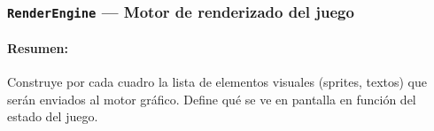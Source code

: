 \documentclass[11pt,a4paper]{article}
\begin{document}








\subsubsection{\texttt{RenderEngine} — Motor de renderizado del juego}
\paragraph{Resumen:} Construye por cada cuadro la lista de elementos visuales (sprites, textos) que serán enviados al motor gráfico. Define qué se ve en pantalla en función del estado del juego.
\end{document}

